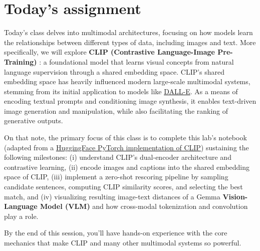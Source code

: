 \section{Today's assignment}
Today's class delves into multimodal architectures, focusing on how models learn the relationships between different types of data, including images and text. More specifically, we will explore \textbf{CLIP (Contrastive Language-Image Pre-Training)} \cite{clip_multimodal_day}: a foundational model that learns visual concepts from natural language supervision through a shared embedding space. CLIP's shared embedding space has heavily influenced modern large-scale multimodal systems, stemming from its initial application to models like \href{https://openai.com/index/dall-e/}{DALL-E}. As a means of encoding textual prompts and conditioning image synthesis, it enables text-driven image generation and manipulation, while also facilitating the ranking of generative outputs.

On that note, the primary focus of this class is to complete this lab's notebook (adapted from a \href{https://github.com/huggingface/transformers/blob/f4fc42216cd56ab6b68270bf80d811614d8d59e4/src/transformers/models/clip/modeling_clip.py#L860}{HuggingFace PyTorch implementation of CLIP}) sustaining the following milestones: (i) understand CLIP's dual-encoder architecture and contrastive learning, (ii) encode images and captions into the shared embedding space of CLIP, (iii) implement a zero-shot rescoring pipeline by sampling candidate sentences, computing CLIP similarity scores, and selecting the best match, and (iv) visualizing resulting image-text distances of a Gemma \textbf{Vision-Language Model (VLM)} and how cross-modal tokenization and convolution play a role.

By the end of this session, you'll have hands-on experience with the core mechanics that make CLIP and many other multimodal systems so powerful.



